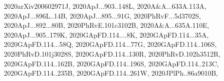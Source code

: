 \documentclass[12pt]{article}
\begin{document}
\begin{description}
{2020arXiv200602971J,%
2020ApJ...903..148L,%
2020A&A...633A.113A,%
2020ApJ...896L..14B,%
2020ApJ...895...91G,%
2020PhRvF...5d3702S,%
2020ApJ...892...80B,%
2020PhRvE.101c3102B,%
2020A&A...635A.110E,%
2020ApJ...905..179K,%
2020GApFD.114....8K,%
2020GApFD.114...35A,%
2020GApFD.114...58Q,%
2020GApFD.114...77G,%
2020GApFD.114..106S,%
2020PhRvD.101j3028S,%
2020GApFD.114..130R,%
2020PhRvD.102h3512R,%
2020GApFD.114..162B,%
2020GApFD.114..196S,%
2020GApFD.114..213C,%
2020GApFD.114..235B,%
2020GApFD.114..261W,%
2020JPlPh..86a9010B,%
}
\end{description}
\end{document}
